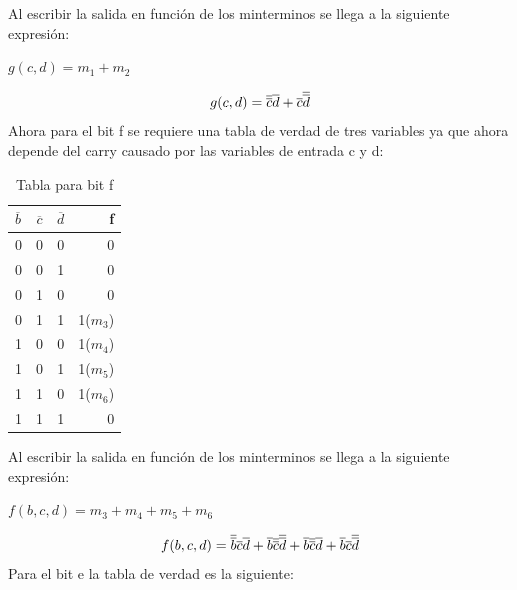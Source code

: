 \documentclass{article}
\begin{document}
		\newline Al escribir la salida en función de los minterminos se llega a la siguiente expresión:
		\newline \centerline{$g(c,d)=m_{1}+m_{2}$}
		\begin{equation}
			\centerline{$g(c,d)=\overline{\overline{c}}\overline{d}+\overline{c}\overline{\overline{d}}$}
		\end{equation}
		\newline Ahora para el bit f se requiere una tabla de verdad de tres variables ya que ahora depende del carry causado por las variables de entrada c y d:
		\begin{table}[h!]
			\begin{center}
				\caption{Tabla para bit f}
				\begin{tabular}{l|c|c|r}
				\textbf{$\overline{b}$} & \textbf{$\overline{c}$} & \textbf{$\overline{d}$} & \textbf{f}\\
				\hline
				0 & 0 & 0 & 0\\
				0 & 0 & 1 & 0\\	
				0 & 1 & 0 & 0\\
				0 & 1 & 1 & 1($m_{3}$)\\
				1 & 0 & 0 & 1($m_{4}$)\\
				1 & 0 & 1 & 1($m_{5}$)\\	
				1 & 1 & 0 & 1($m_{6}$)\\
				1 & 1 & 1 & 0\\				
				\end{tabular}
			\end{center}
		\end{table}
		\newline Al escribir la salida en función de los minterminos se llega a la siguiente expresión:
		\newline \centerline{$f(b,c,d)=m_{3}+m_{4}+m_{5}+m_{6}$}
		\begin{equation}
			\centerline{$f(b,c,d)=\overline{\overline{b}}\overline{c}\overline{d}+\overline{b}\overline{\overline{c}}\overline{\overline{d}}+\overline{b}\overline{\overline{c}}\overline{d}+\overline{b}\overline{c}\overline{\overline{d}}$}
		\end{equation}
		\newline Para el bit e la tabla de verdad es la siguiente:
\end{document}
